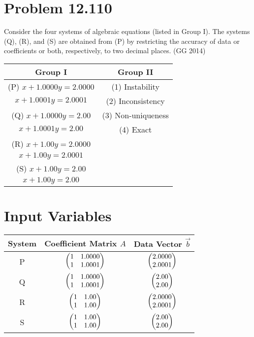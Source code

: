 \documentclass[12pt]{article}
\begin{document}
\section*{Problem 12.110}

Consider the four systems of algebraic equations (listed in Group I). 
The systems (Q), (R), and (S) are obtained from (P) by restricting the accuracy 
of data or coefficients or both, respectively, to two decimal places. (GG 2014)

\begin{table}[H]
\centering
\begin{tabular}{|c|c|}
\hline
\textbf{Group I} & \textbf{Group II} \\
\hline
(P)\; $x+1.0000y=2.0000$ & (1)\; Instability \\
\;\;\;\;\; $x+1.0001y=2.0001$ & (2)\; Inconsistency \\
(Q)\; $x+1.0000y=2.00$ & (3)\; Non-uniqueness \\
\;\;\;\;\; $x+1.0001y=2.00$ & (4)\; Exact \\
(R)\; $x+1.00y=2.0000$ & \\
\;\;\;\;\; $x+1.00y=2.0001$ & \\
(S)\; $x+1.00y=2.00$ & \\
\;\;\;\;\; $x+1.00y=2.00$ & \\
\hline
\end{tabular}
\end{table}

\section*{Input Variables}

\begin{table}[H]
\centering
\begin{tabular}{|c|c|c|}
\hline
System & Coefficient Matrix $A$ & Data Vector $\vec{b}$ \\
\hline
P & $\begin{pmatrix}1 & 1.0000 \\ 1 & 1.0001\end{pmatrix}$ & $\begin{pmatrix}2.0000 \\ 2.0001\end{pmatrix}$ \\
Q & $\begin{pmatrix}1 & 1.0000 \\ 1 & 1.0001\end{pmatrix}$ & $\begin{pmatrix}2.00 \\ 2.00\end{pmatrix}$ \\
R & $\begin{pmatrix}1 & 1.00 \\ 1 & 1.00\end{pmatrix}$ & $\begin{pmatrix}2.0000 \\ 2.0001\end{pmatrix}$ \\
S & $\begin{pmatrix}1 & 1.00 \\ 1 & 1.00\end{pmatrix}$ & $\begin{pmatrix}2.00 \\ 2.00\end{pmatrix}$ \\
\hline
\end{tabular}
\end{table}
\end{document}
